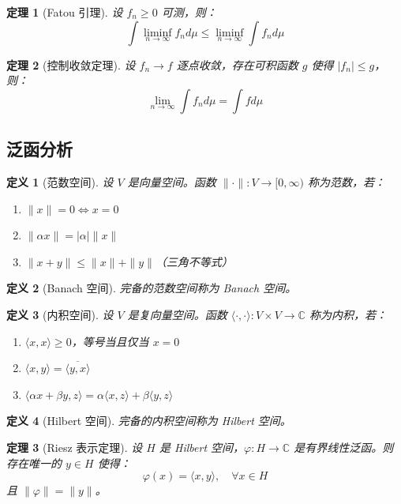 \documentclass[12pt]{article}
\newtheorem{theorem}{定理}[section]
\newtheorem{definition}{定义}[section]
\begin{document}
\begin{theorem}[Fatou 引理]
设 $f_n \geq 0$ 可测，则：
$$\int \liminf_{n \to \infty} f_n d\mu \leq \liminf_{n \to \infty} \int f_n d\mu$$
\end{theorem}

\begin{theorem}[控制收敛定理]
设 $f_n \to f$ 逐点收敛，存在可积函数 $g$ 使得 $|f_n| \leq g$，则：
$$\lim_{n \to \infty} \int f_n d\mu = \int f d\mu$$
\end{theorem}

\subsection{泛函分析}

\begin{definition}[范数空间]
设 $V$ 是向量空间。函数 $\|\cdot\|: V \to [0, \infty)$ 称为范数，若：
\begin{enumerate}
\item $\|x\| = 0 \Leftrightarrow x = 0$
\item $\|\alpha x\| = |\alpha| \|x\|$
\item $\|x + y\| \leq \|x\| + \|y\|$（三角不等式）
\end{enumerate}
\end{definition}

\begin{definition}[Banach 空间]
完备的范数空间称为 Banach 空间。
\end{definition}

\begin{definition}[内积空间]
设 $V$ 是复向量空间。函数 $\langle\cdot, \cdot\rangle: V \times V \to \mathbb{C}$ 称为内积，若：
\begin{enumerate}
\item $\langle x, x \rangle \geq 0$，等号当且仅当 $x = 0$
\item $\langle x, y \rangle = \overline{\langle y, x \rangle}$
\item $\langle \alpha x + \beta y, z \rangle = \alpha\langle x, z \rangle + \beta\langle y, z \rangle$
\end{enumerate}
\end{definition}

\begin{definition}[Hilbert 空间]
完备的内积空间称为 Hilbert 空间。
\end{definition}

\begin{theorem}[Riesz 表示定理]
设 $H$ 是 Hilbert 空间，$\varphi: H \to \mathbb{C}$ 是有界线性泛函。则存在唯一的 $y \in H$ 使得：
$$\varphi(x) = \langle x, y \rangle, \quad \forall x \in H$$
且 $\|\varphi\| = \|y\|$。
\end{theorem}
\end{document}
